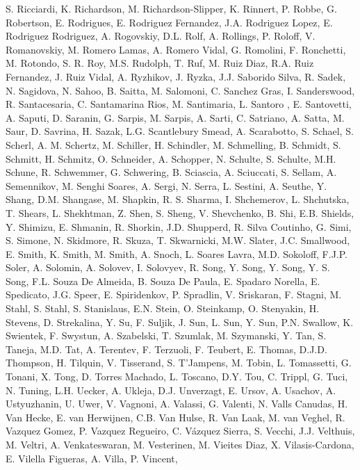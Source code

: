 S. Ricciardi,
K. Richardson,
M. Richardson-Slipper,
K. Rinnert,
P. Robbe,
G. Robertson,
E. Rodrigues,
E. Rodriguez Fernandez,
J.A. Rodriguez Lopez,
E. Rodriguez Rodriguez,
A. Rogovskiy,
D.L. Rolf,
A. Rollings,
P. Roloff,
V. Romanovskiy,
M. Romero Lamas,
A. Romero Vidal,
G. Romolini,
F. Ronchetti,
M. Rotondo,
S. R.  Roy,
M.S. Rudolph,
T. Ruf,
M. Ruiz Diaz,
R.A. Ruiz Fernandez,
J. Ruiz Vidal,
A. Ryzhikov,
J. Ryzka,
J.J. Saborido Silva,
R. Sadek,
N. Sagidova,
N. Sahoo,
B. Saitta,
M. Salomoni,
C. Sanchez Gras,
I. Sanderswood,
R. Santacesaria,
C. Santamarina Rios,
M. Santimaria,
L. Santoro ,
E. Santovetti,
A. Saputi,
D. Saranin,
G. Sarpis,
M. Sarpis,
A. Sarti,
C. Satriano,
A. Satta,
M. Saur,
D. Savrina,
H. Sazak,
L.G. Scantlebury Smead,
A. Scarabotto,
S. Schael,
S. Scherl,
A. M.  Schertz,
M. Schiller,
H. Schindler,
M. Schmelling,
B. Schmidt,
S. Schmitt,
H. Schmitz,
O. Schneider,
A. Schopper,
N. Schulte,
S. Schulte,
M.H. Schune,
R. Schwemmer,
G. Schwering,
B. Sciascia,
A. Sciuccati,
S. Sellam,
A. Semennikov,
M. Senghi Soares,
A. Sergi,
N. Serra,
L. Sestini,
A. Seuthe,
Y. Shang,
D.M. Shangase,
M. Shapkin,
R. S.  Sharma,
I. Shchemerov,
L. Shchutska,
T. Shears,
L. Shekhtman,
Z. Shen,
S. Sheng,
V. Shevchenko,
B. Shi,
E.B. Shields,
Y. Shimizu,
E. Shmanin,
R. Shorkin,
J.D. Shupperd,
R. Silva Coutinho,
G. Simi,
S. Simone,
N. Skidmore,
R. Skuza,
T. Skwarnicki,
M.W. Slater,
J.C. Smallwood,
E. Smith,
K. Smith,
M. Smith,
A. Snoch,
L. Soares Lavra,
M.D. Sokoloff,
F.J.P. Soler,
A. Solomin,
A. Solovev,
I. Solovyev,
R. Song,
Y. Song,
Y. Song,
Y. S.  Song,
F.L. Souza De Almeida,
B. Souza De Paula,
E. Spadaro Norella,
E. Spedicato,
J.G. Speer,
E. Spiridenkov,
P. Spradlin,
V. Sriskaran,
F. Stagni,
M. Stahl,
S. Stahl,
S. Stanislaus,
E.N. Stein,
O. Steinkamp,
O. Stenyakin,
H. Stevens,
D. Strekalina,
Y. Su,
F. Suljik,
J. Sun,
L. Sun,
Y. Sun,
P.N. Swallow,
K. Swientek,
F. Swystun,
A. Szabelski,
T. Szumlak,
M. Szymanski,
Y. Tan,
S. Taneja,
M.D. Tat,
A. Terentev,
F. Terzuoli,
F. Teubert,
E. Thomas,
D.J.D. Thompson,
H. Tilquin,
V. Tisserand,
S. T'Jampens,
M. Tobin,
L. Tomassetti,
G. Tonani,
X. Tong,
D. Torres Machado,
L. Toscano,
D.Y. Tou,
C. Trippl,
G. Tuci,
N. Tuning,
L.H. Uecker,
A. Ukleja,
D.J. Unverzagt,
E. Ursov,
A. Usachov,
A. Ustyuzhanin,
U. Uwer,
V. Vagnoni,
A. Valassi,
G. Valenti,
N. Valls Canudas,
H. Van Hecke,
E. van Herwijnen,
C.B. Van Hulse,
R. Van Laak,
M. van Veghel,
R. Vazquez Gomez,
P. Vazquez Regueiro,
C. V{\'a}zquez Sierra,
S. Vecchi,
J.J. Velthuis,
M. Veltri,
A. Venkateswaran,
M. Vesterinen,
M. Vieites Diaz,
X. Vilasis-Cardona,
E. Vilella Figueras,
A. Villa,
P. Vincent,
